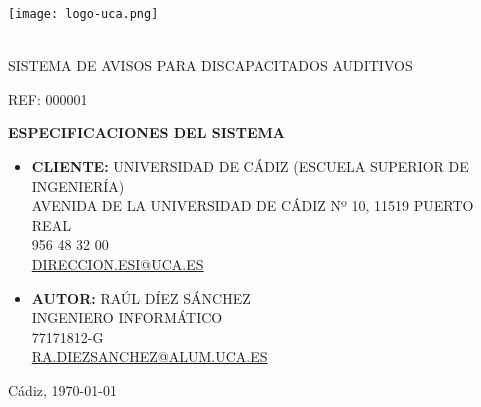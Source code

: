 \thispagestyle{empty}
\normalsize
\mdseries
\begin{center}

  \texttt{[image: logo-uca.png]} \\\

  \vspace{1.5cm}

  \huge{SISTEMA DE AVISOS PARA DISCAPACITADOS AUDITIVOS} \\
  
  \vspace{0.6cm}

  \large{REF: 000001} \\
  
  \vspace{1.0cm}

  \Huge{\textbf{ESPECIFICACIONES DEL SISTEMA}} \\

  \vspace{2.5cm}
  

\end{center}
\begin{itemize}
\item {\textbf{CLIENTE:} UNIVERSIDAD DE CÁDIZ (ESCUELA SUPERIOR DE INGENIERÍA)\\
            AVENIDA DE LA UNIVERSIDAD DE CÁDIZ Nº 10, 11519 PUERTO REAL\\
            956 48 32 00\\
            \underline{DIRECCION.ESI@UCA.ES}
            }
            \vspace{0.5cm}
\item {\textbf{AUTOR:} RAÚL DÍEZ SÁNCHEZ\\
            INGENIERO INFORMÁTICO\\
            77171812-G\\
            \underline{RA.DIEZSANCHEZ@ALUM.UCA.ES}}
\end{itemize}

\vspace{0.2cm}

\begin{flushright}
  \large{Cádiz, \today} \\
\end{flushright}

